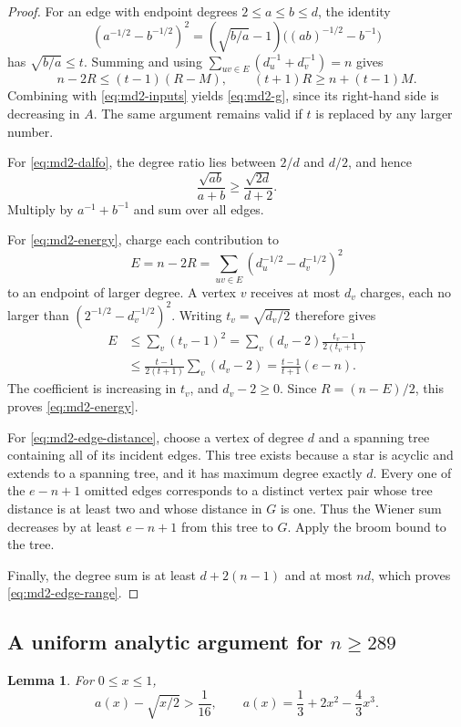\documentclass[11pt,a4paper]{article}
\newtheorem{lemma}[theorem]{Lemma}
\theoremstyle{remark}\newtheorem{remark}[theorem]{Remark}
\begin{document}
\begin{proof}
For an edge with endpoint degrees $2\le a\le b\le d$, the identity
\[
 (a^{-1/2}-b^{-1/2})^2
 =(\sqrt{b/a}-1)\bigl((ab)^{-1/2}-b^{-1}\bigr)
\]
has $\sqrt{b/a}\le t$. Summing and using
$\sum_{uv\in E}(d_u^{-1}+d_v^{-1})=n$ gives
\[
 n-2R\le(t-1)(R-M),\qquad
 (t+1)R\ge n+(t-1)M.
\]
Combining with \eqref{eq:md2-inputs} yields \eqref{eq:md2-g}, since its
right-hand side is decreasing in $A$. The same argument remains valid
if $t$ is replaced by any larger number.

For \eqref{eq:md2-dalfo}, the degree ratio lies between $2/d$ and $d/2$,
and hence
\[
 \frac{\sqrt{ab}}{a+b}\ge\frac{\sqrt{2d}}{d+2}.
\]
Multiply by $a^{-1}+b^{-1}$ and sum over all edges.

For \eqref{eq:md2-energy}, charge each contribution to
\[
 E=n-2R=\sum_{uv\in E}(d_u^{-1/2}-d_v^{-1/2})^2
\]
to an endpoint of larger degree. A vertex $v$ receives at most $d_v$
charges, each no larger than $(2^{-1/2}-d_v^{-1/2})^2$.
Writing $t_v=\sqrt{d_v/2}$ therefore gives
\[
 \begin{aligned}
 E
 &\le\sum_v(t_v-1)^2
 =\sum_v(d_v-2)\frac{t_v-1}{2(t_v+1)}\\
 &\le\frac{t-1}{2(t+1)}\sum_v(d_v-2)
 =\frac{t-1}{t+1}(e-n).
 \end{aligned}
\]
The coefficient is increasing in $t_v$, and $d_v-2\ge0$.
Since $R=(n-E)/2$, this proves \eqref{eq:md2-energy}.

For \eqref{eq:md2-edge-distance}, choose a vertex of degree $d$ and a
spanning tree containing all of its incident edges. This tree exists
because a star is acyclic and extends to a spanning tree, and it has
maximum degree exactly $d$. Every one of the $e-n+1$ omitted edges
corresponds to a distinct vertex pair whose tree distance is at least two
and whose distance in $G$ is one. Thus the Wiener sum decreases by at
least $e-n+1$ from this tree to $G$. Apply the broom bound to the tree.

Finally, the degree sum is at least $d+2(n-1)$ and at most $nd$,
which proves \eqref{eq:md2-edge-range}.
\end{proof}

\subsection{A uniform analytic argument for \texorpdfstring{$n\ge289$}{n >= 289}}

\begin{lemma}\label{lem:md2-one-variable}
For $0\le x\le1$,
\[
 a(x)-\sqrt{x/2}>\frac1{16},
 \qquad a(x)=\frac13+2x^2-\frac43x^3.
\]
\end{lemma}
\end{document}

